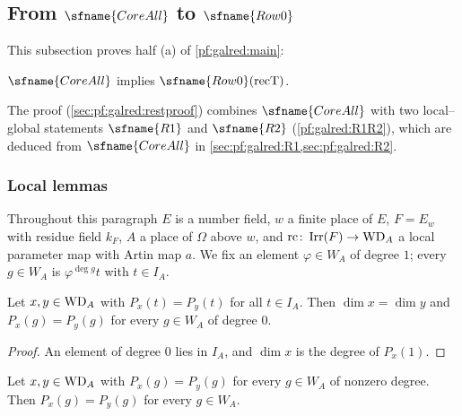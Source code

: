 \subsection{From \texorpdfstring{$\sfname{CoreAll}$}{CoreAll} to \texorpdfstring{$\sfname{Row0}$}{Row0}}\label{sec:pf:galred:rest}

This subsection proves half (a) of \cref{pf:galred:main}:

\begin{theorem}\label{pf:galred:rest}
$\sfname{CoreAll}$ implies $\sfname{Row0}(\mathrm{recT})$.
\end{theorem}

The proof (\cref{sec:pf:galred:restproof}) combines $\sfname{CoreAll}$ with two local--global statements
$\sfname{R1}$ and $\sfname{R2}$ (\cref{pf:galred:R1R2}), which are deduced from $\sfname{CoreAll}$ in
\cref{sec:pf:galred:R1,sec:pf:galred:R2}.

\subsubsection{Local lemmas}\label{sec:pf:galred:local}

Throughout this paragraph $E$ is a number field, $w$ a finite place of $E$, $F=E_w$ with residue field $k_F$, $A$ a
place of $\Omega$ above $w$, and $\mathrm{rc}\colon\operatorname{Irr}(F)\to\mathrm{WD}_A$ a local parameter map with Artin map
$a$. We fix an element $\varphi\in W_A$ of degree $1$; every $g\in W_A$ is $\varphi^{\deg g}t$ with $t\in I_A$.

\begin{lemma}\label{pf:galred:ine}
Let $x,y\in\mathrm{WD}_A$ with $P_x(t)=P_y(t)$ for all $t\in I_A$. Then $\dim x=\dim y$ and $P_x(g)=P_y(g)$ for
every $g\in W_A$ of degree $0$.
\end{lemma}

\begin{proof}
An element of degree $0$ lies in $I_A$, and $\dim x$ is the degree of $P_x(1)$.
\end{proof}

\begin{lemma}\label{pf:galred:degne0}
Let $x,y\in\mathrm{WD}_A$ with $P_x(g)=P_y(g)$ for every $g\in W_A$ of nonzero degree. Then $P_x(g)=P_y(g)$ for
every $g\in W_A$.
\end{lemma}

